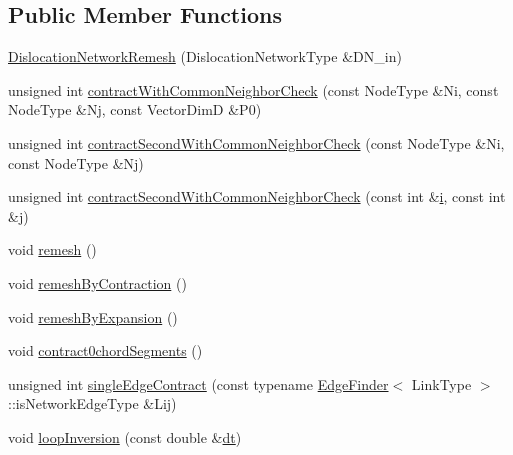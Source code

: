 \subsection*{Public Member Functions}
\begin{DoxyCompactItemize}
\item 
\hyperlink{classmodel_1_1_dislocation_network_remesh_ab18c74ac073df72e92b46eee4490d2b6}{Dislocation\+Network\+Remesh} (Dislocation\+Network\+Type \&D\+N\+\_\+in)
\item 
unsigned int \hyperlink{classmodel_1_1_dislocation_network_remesh_a6750f6933420a6112b77e0be3cd4eb92}{contract\+With\+Common\+Neighbor\+Check} (const Node\+Type \&Ni, const Node\+Type \&Nj, const Vector\+Dim\+D \&P0)
\item 
unsigned int \hyperlink{classmodel_1_1_dislocation_network_remesh_a8f28edc7028efa797853e3b3f7bf2c89}{contract\+Second\+With\+Common\+Neighbor\+Check} (const Node\+Type \&Ni, const Node\+Type \&Nj)
\item 
unsigned int \hyperlink{classmodel_1_1_dislocation_network_remesh_a162d868a535898709daec84c8ea416e2}{contract\+Second\+With\+Common\+Neighbor\+Check} (const int \&\hyperlink{_cubic_spline_intersection_8m_a6f6ccfcf58b31cb6412107d9d5281426}{i}, const int \&j)
\item 
void \hyperlink{classmodel_1_1_dislocation_network_remesh_abc298ae5a87f810e7039cc2bf9074c12}{remesh} ()
\item 
void \hyperlink{classmodel_1_1_dislocation_network_remesh_a89cd924dc2ccb812d5d4ac053fb43053}{remesh\+By\+Contraction} ()
\item 
void \hyperlink{classmodel_1_1_dislocation_network_remesh_ad21032a70cbbf3e46f6171a75c0c30ac}{remesh\+By\+Expansion} ()
\item 
void \hyperlink{classmodel_1_1_dislocation_network_remesh_ab982057e92a89078ab3769977c7610fa}{contract0chord\+Segments} ()
\item 
unsigned int \hyperlink{classmodel_1_1_dislocation_network_remesh_a72c09e50e43381a00a7fb117da86a8f6}{single\+Edge\+Contract} (const typename \hyperlink{classmodel_1_1_edge_finder}{Edge\+Finder}$<$ Link\+Type $>$\+::is\+Network\+Edge\+Type \&Lij)
\item 
void \hyperlink{classmodel_1_1_dislocation_network_remesh_ae3e82966f04e6a2f4eab71244a523117}{loop\+Inversion} (const double \&\hyperlink{plot_stress_strain_8m_a770f288d3048ff6cbee9faa0969fd6b0}{dt})
\end{DoxyCompactItemize}
